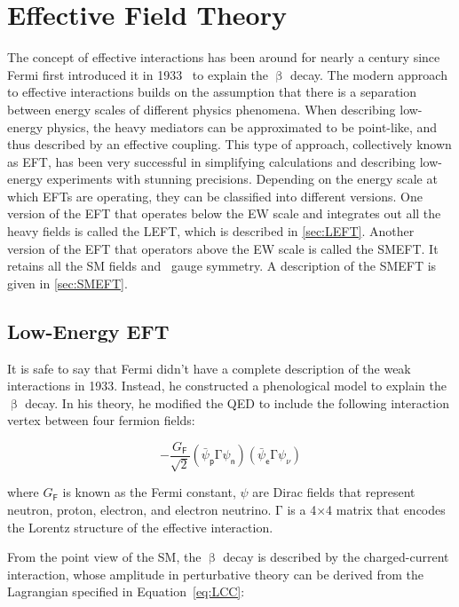 \chapter{Effective Field Theory}
\label{chap:EFT}

The concept of effective interactions has been around for nearly a century since Fermi first introduced it in 1933~\cite{Fermi:1933jpa} to explain the $\upbeta$ decay. The modern approach to effective interactions builds on the assumption that there is a separation between energy scales of different physics phenomena. When describing low-energy physics, the heavy mediators can be approximated to be point-like, and thus described by an effective coupling. This type of approach, collectively known as \ac{EFT}, has been very successful in simplifying calculations and describing low-energy experiments with stunning precisions. Depending on the energy scale at which \acp{EFT} are operating, they can be classified into different versions. One version of the \ac{EFT} that operates below the \ac{EW} scale and integrates out all the heavy fields is called the \ac{LEFT}, which is described in \autoref{sec:LEFT}. Another version of the \ac{EFT} that operators above the \ac{EW} scale is called the \ac{SMEFT}. It retains all the \ac{SM} fields and \sm~gauge symmetry. A description of the \ac{SMEFT} is given in \autoref{sec:SMEFT}.

\section{Low-Energy EFT}
\label{sec:LEFT}

It is safe to say that Fermi didn't have a complete description of the weak interactions in 1933. Instead, he constructed a phenological model to explain the $\upbeta$ decay. In his theory, he modified the \ac{QED} to include the following interaction vertex between four fermion fields:

\begin{equation}
-\frac{G_{\textsf{F}}}{\sqrt{2}}(\bar{\psi}_{\textsf{p}}\mathrm{\Gamma}\psi_{\textsf{n}})(\bar{\psi}_{\textsf{e}}\mathrm{\Gamma}\psi_{\nu})
\end{equation}

where $G_{\textsf{F}}$ is known as the Fermi constant, $\psi$ are Dirac fields that represent neutron, proton, electron, and electron neutrino. $\mathrm{\Gamma}$ is a 4$\times$4 matrix that encodes the Lorentz structure of the effective interaction. 

From the point view of the \ac{SM}, the $\upbeta$ decay is described by the charged-current interaction, whose amplitude in perturbative theory can be derived from the Lagrangian specified in Equation~\ref{eq:LCC}:


